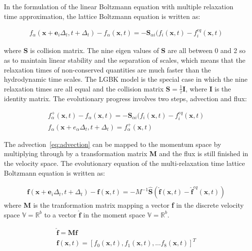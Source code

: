 In the formulation of the linear Boltzmann equation with multiple relaxation 
time approximation, the lattice Boltzmann equation is written as:

\begin{align}
f_{\alpha}(\mathbf{x}+\mathbf{e}_i\Delta_t, t+ 
\Delta_t)-f_{\alpha}(\mathbf{x},t)=-\mathbf{S}_{\alpha 
i}(f_i(\mathbf{x},t)-f_i^{eq}(\mathbf{x},t)
\end{align}

\noindent where \textbf{S} is collision matrix. The nine eigen values of 
\textbf{S} are all between 0 and 2 so as to maintain linear stability and the 
separation of scales, which means that the relaxation times of non-conserved 
quantities are much faster than the hydrodynamic time scales. The LGBK model is 
the special case in which the nine relaxation times are all equal and the 
collision matrix $\mathbf{S}=\frac{1}{\tau}\mathbf{I}$, where \textbf{I} is the 
identity matrix. The evolutionary progress involves two steps, advection and 
flux:

\begin{gather}
f_{\alpha}^+(\mathbf{x},t)-f_{\alpha}(\mathbf{x},t) = -\mathbf{S}_{\alpha i}(f_i(\mathbf{x},t)-f_i^{eq}(\mathbf{x},t) \label{eq:advection}\\
f_{\alpha}(\mathbf{x}+e_{\alpha}\Delta_t, t+\Delta_t) = f_{\alpha}^+(\mathbf{x},t)
\end{gather}

\noindent The advection~\cref{eq:advection} can be mapped to the momentum 
space by multiplying through by a transformation matrix \textbf{M} and the flux 
is still finished in the velocity space. The evolutionary equation of the 
multi-relaxation time lattice Boltzmann equation is written as:

\begin{gather}
\mathbf{f}(\mathbf{x}+\mathbf{e}_i\Delta_t, t+ 
\Delta_t)-\mathbf{f}(\mathbf{x},t)=-M^{-1}\hat{\mathbf{S}}(\hat{\mathbf{f}}
(\mathbf{x},t)-\hat{\mathbf{f}}^{eq}(\mathbf{x},t))
\end{gather}
\noindent where \textbf{M} is the tranformation matrix mapping a vector 
\textbf{f} in the discrete velocity space $\mathds{V}=\mathds{R}^b$ to a vector 
$\hat{\mathbf{f}}$ in the moment space $\mathds{V}=\mathds{R}^b$. 

\begin{gather}
\nonumber
\hat{\mathbf{f}}= \mathbf{M}\mathbf{f} \\ 
\nonumber
\mathbf{f}(\mathbf{x},t) =\left[f_0(\mathbf{x},t),f_1(\mathbf{x},t),\dots f_8(\mathbf{x},t)\right]^T
\end{gather}


